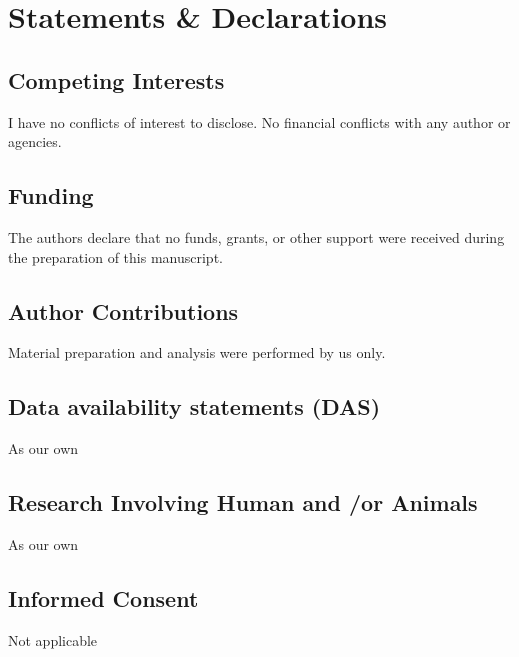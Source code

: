 \documentclass[sn-mathphys-num]{sn-jnl}
\theoremstyle{thmstyleone}
\theoremstyle{thmstyletwo}%
\theoremstyle{thmstylethree}%
\begin{document}
\newpage

\section*{\textbf{Statements \& Declarations}}

\subsection*{Competing Interests}
I have no conflicts of interest to disclose. No financial conflicts with any author
or agencies.

\subsection*{Funding}
The authors declare that no funds, grants, or other support were received during the preparation of this manuscript.

\subsection*{Author Contributions}
Material preparation and analysis were performed by us only.

\subsection*{Data availability statements (DAS)}
As our own

\subsection*{Research Involving Human and /or Animals}
As our own

\subsection*{Informed Consent}
Not applicable



\end{document}
